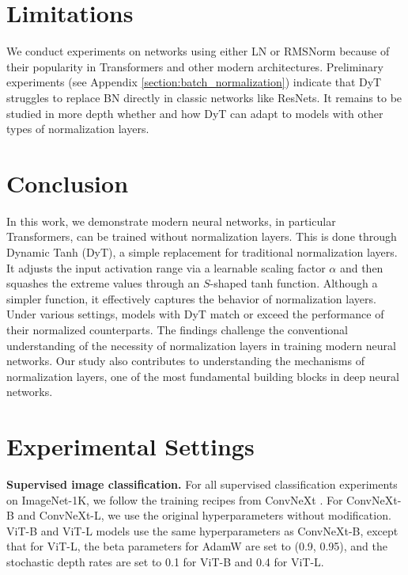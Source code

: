 \documentclass[]{fairmeta}
\renewcommand{\paragraph}[1]{\vspace{1.25mm}\noindent\textbf{#1}}
\begin{document}
\section{Limitations}

We conduct experiments on networks using either LN or RMSNorm because of their popularity in Transformers and other modern architectures. Preliminary experiments (see Appendix \ref{section:batch_normalization}) indicate that DyT struggles to replace BN directly in classic networks like ResNets. It remains to be studied in more depth whether and how DyT can adapt to models with other types of normalization layers.




\section{Conclusion}

In this work, we demonstrate modern neural networks, in particular Transformers, can be trained without normalization layers. This is done through Dynamic Tanh (DyT), a simple replacement for traditional normalization layers. It adjusts the input activation range via a learnable scaling factor $\alpha$ and then squashes the extreme values through an $S$-shaped tanh function. Although a simpler function, it effectively captures the behavior of normalization layers. Under various settings, models with DyT match or exceed the performance of their normalized counterparts. The findings challenge the conventional understanding of the necessity of normalization layers in training modern neural networks. Our study also contributes to understanding the mechanisms of normalization layers, one of the most fundamental building blocks in deep neural networks.
 



\beginappendix

\appendix


\section{Experimental Settings}
\label{section:reproduce}

\paragraph{Supervised image classification.} For all supervised classification experiments on ImageNet-1K, we follow the training recipes from ConvNeXt \citep{convnext}.
For ConvNeXt-B and ConvNeXt-L, we use the original hyperparameters without modification.
ViT-B and ViT-L models use the same hyperparameters as ConvNeXt-B, except that for ViT-L, the beta parameters for AdamW are set to (0.9, 0.95), and the stochastic depth rates are set to 0.1 for ViT-B and 0.4 for ViT-L. 
\end{document}
